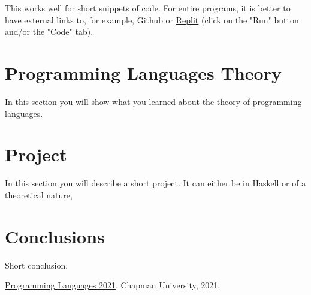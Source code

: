 \documentclass{article}
\begin{document}
\medskip\noindent
This works well for short snippets of code. For entire programs, it is better to have external links to, for example, Github or \href{https://replit.com/@alexhkurz/automata01#main.hs}{Replit} (click on the "Run" button and/or the "Code" tab).


\section{Programming Languages Theory}

In this section you will show what you learned about the theory of programming languages.

\section{Project}

In this section you will describe a short project. It can either be in Haskell or of a theoretical nature,

\section{Conclusions}\label{conclusions}
Short conclusion.

\begin{thebibliography}{99}
 \href{https://github.com/alexhkurz/programming-languages-2021/blob/main/README.md}{Programming Languages 2021}, Chapman University, 2021.
\end{thebibliography}
\end{document}
